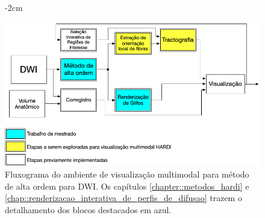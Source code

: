 \documentclass[
    12pt,                %
    oneside,            %
    a4paper,            %
    english,            %
    french,                %
    spanish,            %
    brazil                %
    ]{abntex2}
\begin{document}
\begin{figure}[ht]
   \centering
       \addtolength{\leftskip} {-2cm} %
    \addtolength{\rightskip}{-2cm}

    \centering
    \includegraphics[width=.9\linewidth, angle=0]{figs/Introducao/fluxograma_VMTK_HARDI.png}
    \caption{Fluxograma do ambiente de visualização multimodal para método de alta ordem para DWI. Os capítulos \ref{chapter::metodos_hardi} e \ref{chap::renderizacao_interativa_de_perfis_de_difusao} trazem o detalhamento dos blocos destacados em azul.}
    \label{fig::flowchart_vmtk_hardi}
\end{figure}





\end{document}
